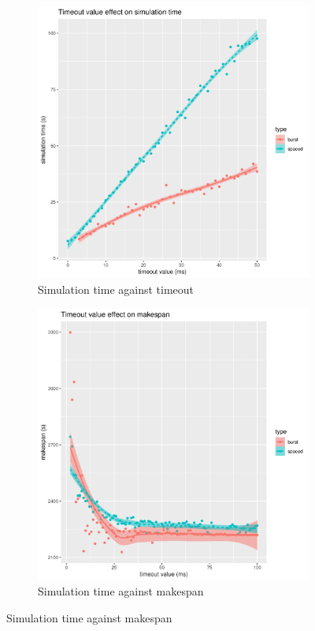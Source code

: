 \documentclass[12pt, a4paper]{memoir}
\begin{document}
\begin{figure}[h]
	\begin{subfigure}{.5\textwidth}
		\centering
		\includegraphics[width=\linewidth]{imgs/timeout_duration.png}
		\caption{Simulation time against timeout}
		\label{fig:timeout_duration}
	\end{subfigure}
	\begin{subfigure}{.5\textwidth}
		\centering
		\includegraphics[width=\linewidth]{imgs/timeout_makespan.png}
		\caption{Simulation time against makespan}
		\label{fig:timeout_makespan}
	\end{subfigure}


\end{figure}
\end{document}
